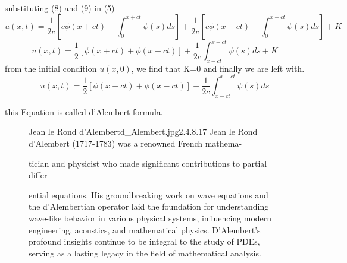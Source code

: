 \documentclass[]{article}
\begin{document}
substituting (8) and (9) in (5)
\[
    u\left(x,t\right) = \frac{1}{2c}\left[c\phi\left(x+ct\right)+\int_{0}^{x+ct} \psi\left(s\right)ds\right]+\frac{1}{2c}\left[c\phi\left(x-ct\right)-\int_{0}^{x-ct} \psi\left(s\right)ds\right]+K    
\]
\[
    u\left(x,t\right) = \frac{1}{2}\left[\phi\left(x+ct\right)+\phi\left(x-ct\right)\right]+\frac{1}{2c}\int_{x-ct}^{x+ct} \psi\left(s\right)ds + K    
\]
from the initial condition $u(x,0)$, we find that K=0 and finally we are left with.
\[
    u\left(x,t\right) = \frac{1}{2}\left[\phi\left(x+ct\right)+\phi\left(x-ct\right)\right]+\frac{1}{2c}\int_{x-ct}^{x+ct} \psi\left(s\right)ds    
\]

this Equation is called d'Alembert formula.
\begin{figure}[b]
    \begin{enrichment}{Jean le Rond d'Alembert}{d_Alembert.jpg}{2.4}{.8}{.17}
        Jean le Rond d'Alembert (1717-1783) was a renowned French mathema-
        
        tician and physicist who made significant contributions to partial differ-
        
        ential equations. His groundbreaking work on wave equations and the d'Alembertian operator laid the foundation for understanding wave-like behavior in various physical systems, influencing modern engineering, acoustics, and mathematical physics.
        D'Alembert's profound insights continue to be integral to the study of PDEs, serving as a lasting legacy in the field of mathematical analysis.
    \end{enrichment}    
\end{figure}

\setcounter{equation}{0}
\end{document}
